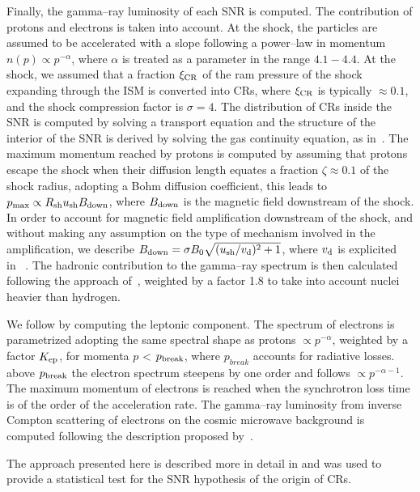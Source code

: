 \documentclass{article}
\begin{document}
Finally, the gamma--ray luminosity of each SNR is computed. The contribution of protons and electrons is taken into account. At the shock, the particles are assumed to be accelerated with a slope following a power--law in momentum $n(p) \propto p^{-\alpha}$, where $\alpha$ is treated as a parameter in the range $4.1 - 4.4$. At the shock, we assumed that a fraction $\xi_{\rm CR}$ of the ram pressure of the shock expanding through the ISM is converted into CRs, where $\xi_{\rm CR}$ is typically $\approx 0.1$, and the shock compression factor is $\sigma=4$.  
The distribution of CRs inside the SNR is computed by solving a transport equation and the structure of the interior of the SNR is derived by solving the gas continuity equation, as in~\cite{pz03,pz05}.
The maximum momentum reached by protons is computed by assuming that protons escape the shock when their diffusion length equates a fraction $\zeta \approx 0.1$ of the shock radius, adopting a Bohm diffusion coefficient, this leads to $p_{\max} \propto R_{\rm sh} u_{\rm sh} B_{\rm down}$, where $B_{\rm down}$ is the magnetic field downstream of the shock. In order to account for magnetic field amplification downstream of the shock, and without making any assumption on the type of mechanism involved in the amplification, we describe $B_{\rm down} = \sigma B_{0}\sqrt{({u_{\rm sh}}/{v_{\rm d}})^{2}+1}$, where $v_{\rm d}$ is explicited in~\cite{zirakashviliaharonian2010} .
The hadronic contribution to the gamma--ray spectrum is then calculated following the approach of~\cite{kelner2006}, weighted by a factor 1.8 to take into account nuclei heavier than hydrogen. 

We follow by computing the leptonic component. 
The spectrum of electrons is parametrized adopting the same spectral shape as protons $\propto p^{-\alpha}$, weighted by a factor $K_{\rm ep}$, for momenta $p$ < $p_{\rm break}$, where $p_{break}$ accounts for radiative losses. above $p_{\rm break}$ the electron spectrum steepens by one order and follows $\propto p^{-\alpha-1}$. The maximum momentum of electrons is reached when the synchrotron loss time is of the order of the acceleration rate. The gamma--ray luminosity from inverse Compton scattering of electrons on the cosmic microwave background is computed following the description proposed by~\cite{gould}.

The approach presented here is described more in detail in \cite{cristofari2013,cristofari2017} and was used to provide a statistical test for the SNR hypothesis of the origin of CRs. 
\end{document}
